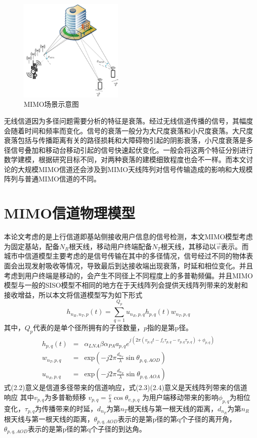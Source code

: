 \documentclass[bachelor,nocolorlinks, printoneside]{seuthesis} %
\begin{document}
\begin{Main}
\begin{figure}[htbp!]
	\centering \includegraphics[width=0.45\textwidth]{img/2_1.jpg} \caption{MIMO场景示意图}
\end{figure}

无线信道因为多径问题需要分析的特征是衰落。经过无线信道传播的信号，其幅度会随着时间和频率而变化。信号的衰落一般分为大尺度衰落和小尺度衰落。大尺度衰落包括与传播距离有关的路径损耗和大障碍物引起的阴影衰落，小尺度衰落是多径信号叠加和移动台移动引起的信号快速起伏变化。一般会将这两个特征分别进行数学建模，根据研究目标不同，对两种衰落的建模细致程度也会不一样。而本文讨论的大规模MIMO信道还会涉及到MIMO天线阵列对信号传输造成的影响和大规模阵列与普通MIMO信道的不同。



\section{MIMO信道物理模型}
本论文考虑的是上行信道即基站侧接收用户信息的信号检测，本文MIMO模型考虑为固定基站，配备$N_{R}$根天线，移动用户终端配备$N_{T}$根天线，其移动以$\overrightarrow{v}$表示。而城市中信道模型主要考虑的是信号传输在其中的多径情况，信号经过不同的物体表面会出现发射吸收等情况，导致最后到达接收端出现衰落，时延和相位变化。并且考虑到用户终端是移动的，会产生不同径上不同程度上的多普勒频偏。并且MIMO模型与一般的SISO模型不相同的地方在于天线阵列会提供天线阵列带来的发射和接收增益，所以本文将信道模型写为如下形式
\begin{equation}\label{key}
h_{n_{R},n_{T},p}(t) = \sum_{q=1}^{Q_{p}}u_{n_{R},p,q}h_{p,q}(t)w_{n_{T},p,q}
\end{equation}
其中，$Q_p$代表的是单个径所拥有的子径数量，$p$指的是第p径。
\begin{eqnarray}\label{key}
h_{p,q}(t) &=& \alpha_{LNA}\beta\alpha_{PA}a_{p,q}e^{j(2\pi 
	(v_{p,q}t-f_{c}\tau_{p,q}-v_{p,q}\tau_{p,q})+\phi_{p,q}
	)} \\
w_{n_{T},p,q} &=& \mathrm{exp}(-j2\pi \frac{d_{n_{T}}}{\lambda}\sin \theta_{p,q,AOD})\\
u_{n_{R},p,q} &=& \mathrm{exp}(-j2\pi \frac{d_{n_{R}}}{\lambda}\sin \theta_{p,q,AOA})
\end{eqnarray}
式(2.2)意义是信道多径带来的信道响应，式(2.3)(2.4)意义是天线阵列带来的信道响应
其中$ v_{p,q} $为多普勒频移 $ v_{p,q} = \frac{v}{\lambda}\cos\theta_{v,p,q} $ 为用户端移动带来的影响$ \phi_{p,q} $为相位变化，$\tau_{p,q}$为传播带来的时延，$d_{n_{T}}$为第$n_T$根天线与第一根天线的距离，$d_{n_{R}}$为第$n_R$根天线与第一根天线的距离，$\theta_{p,q,AOD}$表示的是第p径的第q个子径的离开角，$\theta_{p,q,AOD}$表示的是第p径的第q个子径的到达角。


\end{Main}
\end{document}
